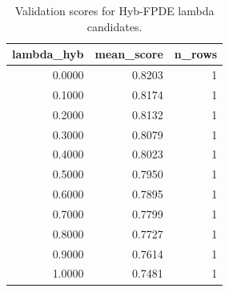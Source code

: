 \begin{table}[t]
\caption{Validation scores for Hyb-FPDE lambda candidates.}
\label{tab:lambda_distribution_computed}
\centering
\begin{tabular}{rrr}
\toprule
lambda\_hyb & mean\_score & n\_rows \\
\midrule
0.0000 & 0.8203 & 1 \\
0.1000 & 0.8174 & 1 \\
0.2000 & 0.8132 & 1 \\
0.3000 & 0.8079 & 1 \\
0.4000 & 0.8023 & 1 \\
0.5000 & 0.7950 & 1 \\
0.6000 & 0.7895 & 1 \\
0.7000 & 0.7799 & 1 \\
0.8000 & 0.7727 & 1 \\
0.9000 & 0.7614 & 1 \\
1.0000 & 0.7481 & 1 \\
\bottomrule
\end{tabular}

\end{table}
